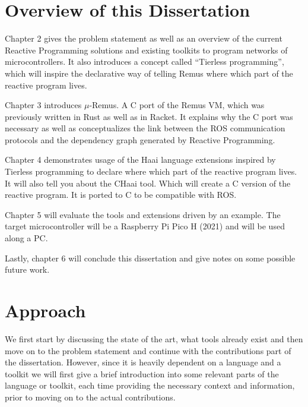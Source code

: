 \documentclass[a4paper]{book}
\begin{document}
\section{Overview of this Dissertation}
\label{sec:overview-of-this-dissertation}
Chapter 2 gives the problem statement as well as an overview of the current
Reactive Programming solutions and existing toolkits to program networks of
microcontrollers. It also introduces a concept called \enquote{Tierless
	programming}, which will inspire the declarative way of telling Remus where
which part of the reactive program lives.
\par
Chapter 3 introduces $\mu$-Remus. A C port of the Remus VM, which was previously
written in Rust as well as in Racket. It explains why the C port was necessary
as well as conceptualizes the link between the ROS communication protocols and
the dependency graph generated by Reactive Programming.
\par
Chapter 4 demonstrates usage of the Haai language extensions inspired by
Tierless programming to declare where which part of the reactive program lives.
It will also tell you about the CHaai tool. Which will create a C version of the
reactive program. It is ported to C to be compatible with ROS.
\par
Chapter 5 will evaluate the tools and extensions driven by an example. The
target microcontroller will be a Raspberry Pi Pico H (2021) and will be used
along a PC.
\par
Lastly, chapter 6 will conclude this dissertation and give notes on some
possible future work.
\section{Approach}
\label{sec:approach}
We first start by discussing the state of the art, what tools already exist and
then move on to the problem statement and continue with the contributions part
of the dissertation. However, since it is heavily dependent on a language and a
toolkit we will first give a brief introduction into some relevant parts of the
language or toolkit, each time providing the necessary context and information,
prior to moving on to the actual contributions.
\end{document}
